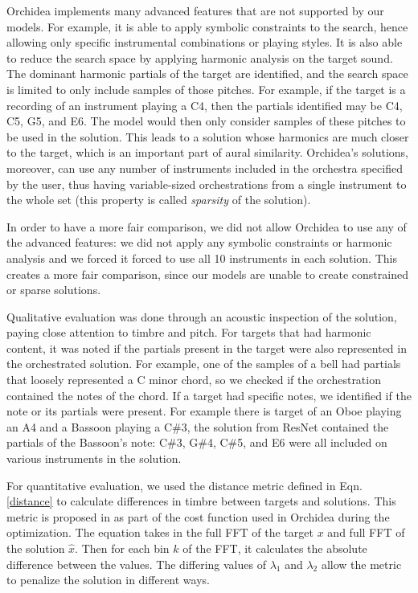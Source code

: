 \documentclass{article}
\begin{document}
Orchidea implements many advanced features that are not supported by our models. For example, it is able to apply symbolic constraints to the search, hence allowing only specific instrumental combinations or playing styles. It is also able to reduce the search space by applying harmonic analysis on the target sound.
The dominant harmonic partials of the target are identified, and the search space is limited to only include samples of those pitches. For example, if the target is a recording of an instrument playing a C4, then the partials identified may be C4, C5, G5, and E6. The model would then only consider samples of these pitches to be used in the solution. This leads to a solution whose harmonics are much closer to the target, which is an important part of aural similarity.
Orchidea's solutions, moreover, can use any number of instruments included in the orchestra specified by the user, thus having variable-sized orchestrations from a single instrument to the whole set (this property is called \emph{sparsity} of the solution).

In order to have a more fair comparison, we did not allow Orchidea to use any of the advanced features: we did not apply any symbolic constraints or harmonic analysis and we forced it forced to use all 10 instruments in each solution. This creates a more fair comparison, since our models are unable to create constrained or sparse solutions.

Qualitative evaluation was done through an acoustic inspection of the solution, paying close attention to timbre and pitch. For targets that had harmonic content, it was noted if the partials present in the target were also represented in the orchestrated solution. For example, one of the samples of a bell had partials that loosely represented a C minor chord, so we checked if the orchestration contained the notes of the chord. If a target had specific notes, we identified if the note or its partials were present. For example there is target of an Oboe playing an A4 and a Bassoon playing a C\#3, the solution from ResNet contained the partials of the Bassoon's note: C\#3, G\#4, C\#5, and E6 were all included on various instruments in the solution.

For quantitative evaluation, we used the distance metric defined in Eqn. \eqref{distance} to calculate differences in timbre between targets and solutions. This metric is proposed in \cite{Cella2020} as part of the cost function used in Orchidea during the optimization. The equation takes in the full FFT of the target $x$ and full FFT of the solution $\hat{x}$. Then for each bin $k$ of the FFT, it calculates the absolute difference between the values. The differing values of $\lambda_1$ and $\lambda_2$ allow the metric to penalize the solution in different ways. 
\end{document}
